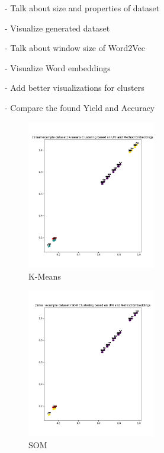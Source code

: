 \documentclass[
    fontsize=12pt,
    headings=small,
    parskip=half,           %
    bibliography=totoc,
    numbers=noenddot,       %
    open=any,               %
    ]{scrreprt}
\begin{document}
- Talk about size and properties of dataset

- Visualize generated dataset

- Talk about window size of Word2Vec

- Visualize Word embeddings

- Add better visualizations for clusters

- Compare the found Yield and Accuracy


\begin{figure}[H]
	\sffamily\footnotesize
	\includegraphics[width=0.5\textwidth]{pic/kmeans.png}
	\unitlength=0.75mm
	\linethickness{0.4pt}
	\caption{K-Means}
	\label{fig:kmeans_clusters}
\end{figure}

\begin{figure}[H]
	\sffamily\footnotesize
	\includegraphics[width=0.5\textwidth]{pic/SOM.png}
	\unitlength=0.75mm
	\linethickness{0.4pt}
	\caption{SOM}
	\label{fig:som_clusters}
\end{figure}
\end{document}
